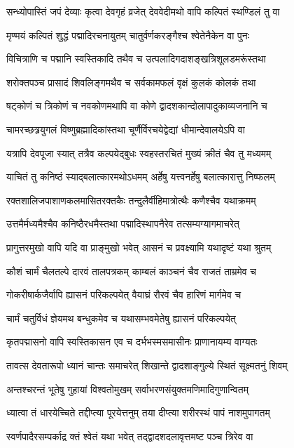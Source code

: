 \twolineshloka
{सन्ध्योपास्तिं जपं देव्याः कृत्वा देवगृहं व्रजेत्}
{देववेदीमथो वापि कल्पितं स्थण्डिलं तु वा}%

\twolineshloka
{मृण्मयं कल्पितं शुद्धं पद्मादिरचनायुतम्}
{चातुर्वर्णकरङ्गैश्च श्वेतेनैकेन वा पुनः}%

\twolineshloka
{विचित्राणि च पद्मानि स्वस्तिकादि तथैव च}
{उत्पलादिगदाशङ्खत्रिशूलडमरूंस्तथा}%

\twolineshloka
{शरोक्तपञ्च प्रासादं शिवलिङ्गमथैव च}
{सर्वकामफलं वृक्षं कुलकं कोलकं तथा}%

\twolineshloka
{षट्कोणं च त्रिकोणं च नवकोणमथापि वा}
{कोणे द्वादशकान्दोलापादुकाव्यजनानि च}%

\twolineshloka
{चामरच्छत्र्रयुगलं विष्णुब्रह्मादिकांस्तथा}
{चूर्णैर्विरचयेद्वेद्यां धीमान्देवालयेऽपि वा}%

\twolineshloka
{यत्रापि देवपूजा स्यात् तत्रैव कल्पयेद्बुधः}
{स्वहस्तरचितं मुख्यं क्रीतं चैव तु मध्यमम्}%

\twolineshloka
{याचितं तु कनिष्ठं स्याद्बलात्कारमथोऽधमम्}
{अर्हेषु यत्त्वनर्हेषु बलात्कारात्तु निष्फलम्}%

\twolineshloka
{रक्तशालिजपाशाणकलमासितरक्तकैः}
{तन्दुलैर्वीहिमात्रोत्थैः कणैश्चैव यथाक्रमम्}%

\twolineshloka
{उत्तमैर्मध्यमैश्चैव कनिष्ठैरधमैस्तथा}
{पद्मादिस्थापनैरेव तत्सम्यग्यागमाचरेत्}%

\twolineshloka
{प्रागुत्तरमुखो वापि यदि वा प्राङ्मुखो भवेत्}
{आसनं च प्रवक्ष्यामि यथादृष्टं यथा श्रुतम्}%

\twolineshloka
{कौशं चार्मं चैलतल्पे दारवं तालपत्रकम्}
{काम्बलं काञ्चनं चैव राजतं ताम्रमेव च}%

\twolineshloka
{गोकरीषार्कजैर्वापि ह्यासनं परिकल्पयेत्}
{वैयाघ्रं रौरवं चैव हारिणं मार्गमेव च}%

\twolineshloka
{चार्मं चतुर्विधं ज्ञेयमथ बन्धुकमेव च}
{यथासम्भवमेतेषु ह्यासनं परिकल्पयेत्}%

\twolineshloka
{कृतपद्मासनो वापि स्वस्तिकासन एव च}
{दर्भभस्मसमासीनः प्राणानायम्य वाग्यतः}%

\twolineshloka
{तावत्स देवतारूपो ध्यानं चान्तः समाचरेत्}
{शिखान्ते द्वादशाङ्गुल्ये स्थितं सूक्ष्मतनुं शिवम्}%

\twolineshloka
{अन्तश्चरन्तं भूतेषु गुहायां विश्वतोमुखम्}
{सर्वाभरणसंयुक्तमणिमादिगुणान्वितम्}%

\twolineshloka
{ध्यात्वा तं धारयेच्चिते तद्दीप्त्या पूरयेत्तनुम्}
{तया दीप्त्या शरीरस्थं पापं नाशमुपागतम्}%

\twolineshloka
{स्वर्णपादैरसम्पर्काद्र क्तं श्वेतं यथा भवेत्}
{तद्द्वादशदलावृत्तमष्ट पञ्च त्रिरेव वा}%

